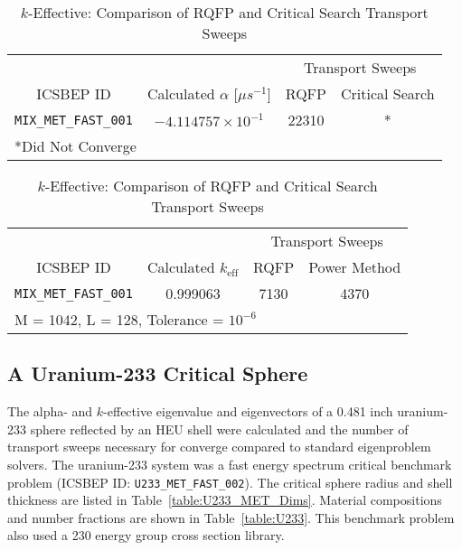 \begin{table}[!htbp]
	\caption{Calculated Eigenvalues and Transport Sweep Comparisons for PU/HEU System}
	\label{table:MIX_MET_Eigs}
	\begin{subtable}[!htbp]{1.0\textwidth}
	\centering{}
	\begin{tabular}{@{}cccc@{}}\toprule
	& & \multicolumn{2}{c}{Transport Sweeps} \\
	\cmidrule{3-4} ICSBEP ID & Calculated $\alpha$ [$\mu s^{-1}$] & RQFP & Critical Search \\
	\midrule
	\texttt{MIX\_MET\_FAST\_001} & $-4.114757 \times 10^{-1}$ & 22310 & * \\
	\bottomrule
	\multicolumn{4}{l}{*Did Not Converge} \\
	\end{tabular}
	\caption{Alpha-Eigenvalue: Comparison of RQFP and Critical Search Transport Sweeps}
	\label{table:MIX_MET_Alpha}
	\end{subtable}%
	\vspace{0.25cm}
	\begin{subtable}[!htbp]{1.0\textwidth}
	\centering{}
	\begin{tabular}{@{}cccc@{}}\toprule
	& & \multicolumn{2}{c}{Transport Sweeps} \\
	\cmidrule{3-4} ICSBEP ID & Calculated $k_{\text{eff}}$ & RQFP & Power Method \\
	\midrule
	\texttt{MIX\_MET\_FAST\_001} & 0.999063 & 7130 & 4370 \\
	\bottomrule
	\multicolumn{4}{l}{M = 1042, L = 128, Tolerance = $10^{-6}$} \\
	\end{tabular}
	\caption{$k$-Effective: Comparison of RQFP and Critical Search Transport Sweeps}
	\label{table:MIX_MET_k}
	\end{subtable}%
\end{table}

\clearpage
\subsection{A Uranium-233 Critical Sphere}

The alpha- and $k$-effective eigenvalue and eigenvectors of a 0.481 inch uranium-233 sphere reflected by an HEU shell were calculated and the number of transport sweeps necessary for converge compared to standard eigenproblem solvers. The uranium-233 system was a fast energy spectrum critical benchmark problem (ICSBEP ID: \texttt{U233\_MET\_FAST\_002}). The critical sphere radius and shell thickness are listed in Table~\ref{table:U233_MET_Dims}. Material compositions and number fractions are shown in Table~\ref{table:U233}. This benchmark problem also used a 230 energy group cross section library.

